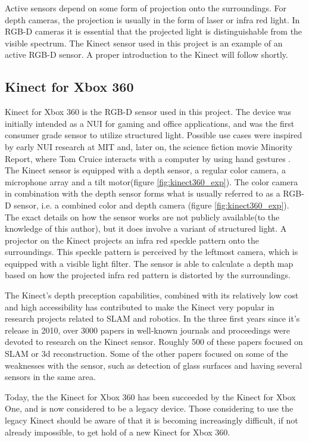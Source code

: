 Active sensors depend on some form of projection onto the surroundings. For depth cameras, the projection is usually in the form of laser or infra red light. In RGB-D cameras it is essential that the projected light is distinguishable from the visible spectrum. The Kinect sensor used in this project is an example of an active RGB-D sensor. A proper introduction to the Kinect will follow shortly.

\subsection{Kinect for Xbox 360}
\label{sec:kinect}
Kinect for Xbox 360 is the RGB-D sensor used in this project. The device  was initially intended as a \ac{NUI} for gaming and office applications, and was the first consumer grade sensor to utilize structured light. Possible use cases were inspired by early \ac{NUI} research at \ac{MIT} and, later on, the science fiction movie Minority Report, where Tom Cruice interacts with a computer by using hand gestures \cite{kinect_book}. The Kinect sensor is equipped with a depth sensor, a regular color camera, a microphone array and a tilt motor(figure \ref{fig:kinect360_exp}). The color camera in combination with the depth sensor forms what is usually referred to as a RGB-D sensor, i.e. a combined color and depth camera (figure \ref{fig:kinect360_exp}). The exact details on how the sensor works are not publicly available(to the knowledge of this author), but it does involve a variant of structured light. A projector on the Kinect projects an infra red speckle pattern onto the surroundings. This speckle pattern is perceived by the leftmost camera, which is equipped with a visible light filter. The sensor is able to calculate a depth map based on how the projected infra red pattern is distorted by the surroundings.

The Kinect's depth preception capabilities, combined with its relatively low cost and high accessibility has contributed to make the Kinect very popular in research projects related to \ac{SLAM} and robotics. In the three first years since it's release in 2010, over 3000 papers in well-known journals and proceedings were devoted to research on the Kinect sensor. Roughly 500 of these papers focused on \ac{SLAM} or 3d reconstruction\cite{Berger2013}. Some of the other papers focused on some of the weaknesses with the sensor, such as detection of glass surfaces and having several sensors in the same area. 


Today, the the Kinect for Xbox 360 has been succeeded by the Kinect for Xbox One, and is now considered to be a legacy device. Those considering to use the legacy Kinect should be aware of that it is becoming increasingly difficult, if not already impossible, to get hold of a new Kinect for Xbox 360. 

